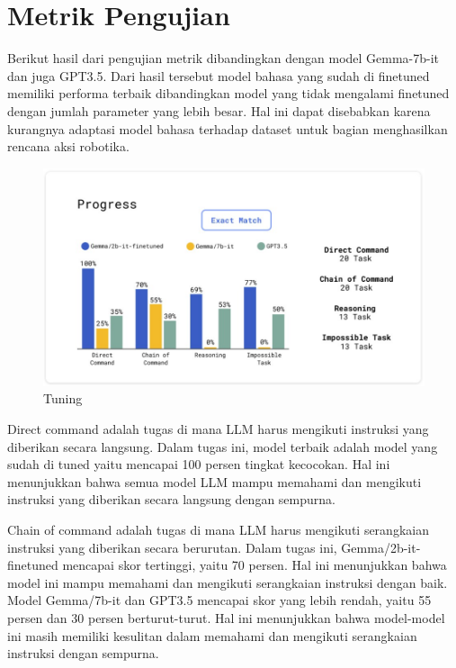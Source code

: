 \section{Metrik Pengujian}
\label{sec:analisis pengujian}

Berikut hasil dari pengujian metrik dibandingkan dengan model Gemma-7b-it dan juga GPT3.5. Dari hasil tersebut model bahasa yang sudah di finetuned memiliki performa terbaik dibandingkan model yang tidak mengalami finetuned dengan jumlah parameter yang lebih besar. Hal ini dapat disebabkan karena kurangnya adaptasi model bahasa terhadap dataset untuk bagian menghasilkan rencana aksi robotika.

\begin{figure} [H] \centering
  \includegraphics[scale=0.7]{gambar/metrik.jpg}
  \caption{Tuning}
\end{figure}

Direct command adalah tugas di mana LLM harus mengikuti instruksi yang diberikan secara langsung. Dalam tugas ini, model terbaik adalah model yang sudah di tuned yaitu mencapai 100 persen tingkat kecocokan. Hal ini menunjukkan bahwa semua model LLM mampu memahami dan mengikuti instruksi yang diberikan secara langsung dengan sempurna.

Chain of command adalah tugas di mana LLM harus mengikuti serangkaian instruksi yang diberikan secara berurutan. Dalam tugas ini, Gemma/2b-it-finetuned mencapai skor tertinggi, yaitu 70 persen. Hal ini menunjukkan bahwa model ini mampu memahami dan mengikuti serangkaian instruksi dengan baik. Model Gemma/7b-it dan GPT3.5  mencapai skor yang lebih rendah, yaitu 55 persen  dan 30 persen berturut-turut. Hal ini menunjukkan bahwa model-model ini masih memiliki kesulitan dalam memahami dan mengikuti serangkaian instruksi dengan sempurna.

